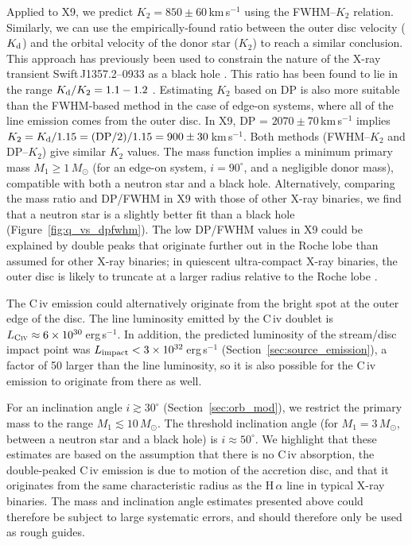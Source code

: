\documentclass[a4paper,fleqn,usenatbib]{mnras}
\begin{document}
Applied to X9, we predict $K_2 = 850 \pm 60$\,km\,s$^{-1}$ using the FWHM--$K_2$ relation. Similarly, we can use the empirically-found ratio between the outer disc velocity ($K_{\rm d}$) and the orbital velocity of the donor star ($K_2$) to reach a similar conclusion. This approach has previously been used to constrain the nature of the X-ray transient Swift\,J1357.2--0933 as a black hole \citep{2013Sci...339.1048C}. This ratio has been found to lie in the range $K_{\rm d}/K_2 = 1.1 - 1.2$ \citep{1994ApJ...436..848O}. Estimating $K_2$ based on DP is also more suitable than the FWHM-based method in the case of edge-on systems, where all of the line emission comes from the outer disc. In X9, DP = $2070\pm70$\,km\,s$^{-1}$ implies $K_2 = K_{\rm d} / 1.15 = ({\rm DP}/2) / 1.15 = 900 \pm 30$\,km\,s$^{-1}$. Both methods (FWHM--$K_2$ and DP--$K_2$) give similar $K_2$ values. The mass function implies a minimum primary mass $M_1 \geq 1\,M_\odot$ (for an edge-on system, $i = 90^\circ$, and a negligible donor mass), compatible with both a neutron star and a black hole. Alternatively, comparing the mass ratio and DP/FWHM in X9 with those of other X-ray binaries, we find that a neutron star is a slightly better fit than a black hole (Figure~\ref{fig:q_vs_dpfwhm}). The low DP/FWHM values in X9 could be explained by double peaks that originate further out in the Roche lobe than assumed for other X-ray binaries; in quiescent ultra-compact X-ray binaries, the outer disc is likely to truncate at a larger radius relative to the Roche lobe \citep{2012A&A...537A.104V}.

The C\,{\sc iv} emission could alternatively originate from the bright spot at the outer edge of the disc. The line luminosity emitted by the C\,{\sc iv} doublet is $L_{{\rm C}\textsc{iv}} \approx 6\times10^{30}$\,erg\,s$^{-1}$. In addition, the predicted luminosity of the stream/disc impact point was $L_{\rm impact} < 3 \times 10^{32}$\,erg\,s$^{-1}$ (Section~\ref{sec:source_emission}), a factor of 50 larger than the line luminosity, so it is also possible for the C\,{\sc iv} emission to originate from there as well.

For an inclination angle $i \gtrsim 30^\circ$ (Section~\ref{sec:orb_mod}), we restrict the primary mass to the range $M_1 \lesssim 10\,M_\odot$. The threshold inclination angle (for $M_1 = 3\,M_\odot$, between a neutron star and a black hole) is $i \approx 50^\circ$. We highlight that these estimates are based on the assumption that there is no C\,{\sc iv} absorption, the double-peaked C\,{\sc iv} emission is due to motion of the accretion disc, and that it originates from the same characteristic radius as the H\,$\alpha$ line in typical X-ray binaries. The mass and inclination angle estimates presented above could therefore be subject to large systematic errors, and should therefore only be used as rough guides.
\end{document}
